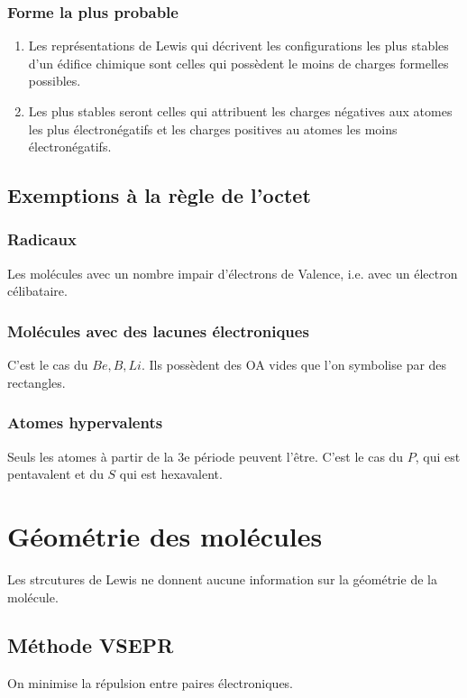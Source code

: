 \documentclass[french]{yLectureNote}
\begin{document}
\subsubsection{Forme la plus probable}
\begin{theorem}
\begin{enumerate}
 \item Les représentations de Lewis qui décrivent les configurations les
plus stables d’un édifice chimique sont celles qui possèdent le moins de charges formelles possibles.
\item Les plus stables seront celles qui attribuent les charges négatives aux atomes les plus électronégatifs et les charges positives au atomes les moins électronégatifs.
\end{enumerate}
\end{theorem}
\subsection{Exemptions à la règle de l'octet}
\subsubsection{Radicaux}
Les molécules avec un nombre impair d'électrons de Valence, i.e. avec un électron célibataire.
\subsubsection{Molécules avec des lacunes électroniques}
C'est le cas du $Be, B, Li$. Ils possèdent des OA vides que l'on symbolise par des rectangles.
\subsubsection{Atomes hypervalents}
Seuls les atomes à partir de la 3e période peuvent l'\^etre. C'est le cas du $P$, qui est pentavalent et du $S$ qui est hexavalent.



\section{Géométrie des molécules}
Les strcutures de Lewis ne donnent aucune information sur la géométrie de la molécule.
\subsection{Méthode VSEPR}
On minimise la répulsion entre paires électroniques.
\end{document}
